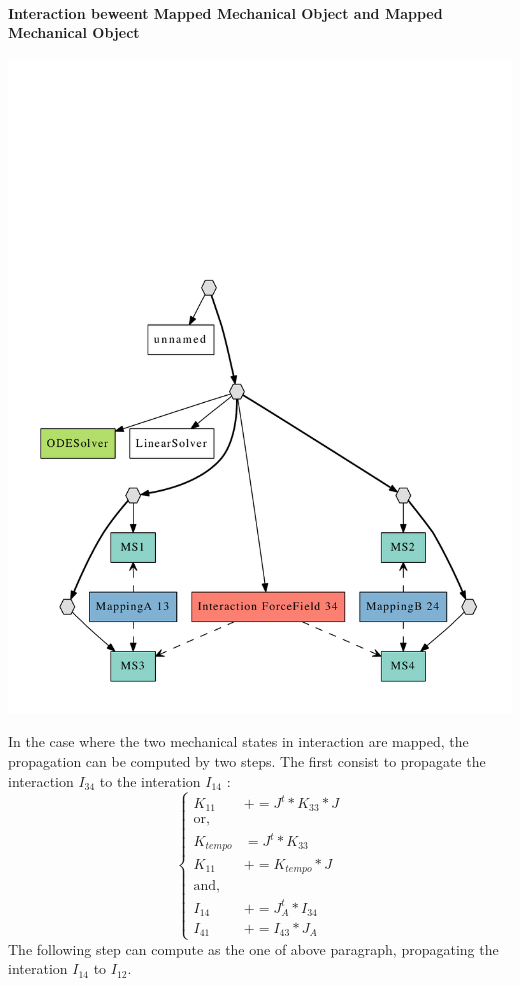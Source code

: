 \paragraph{Interaction beweent Mapped Mechanical Object and Mapped Mechanical Object}
\begin{center}
  \includegraphics[scale=0.3]{interaction_Mapped_Mapped}
\end{center}
In the case where the two mechanical states in interaction are mapped, the propagation can be computed by two steps. The first consist to propagate the interaction $I_{34}$ to the interation $I_{14}$ :
\[
\left\{ 
\begin{array}{ll}
K_{11}       & += J^t * K_{33} * J               \\
\text{or,}   &                                   \\
K_{tempo}    & =  J^t * K_{33}                   \\
K_{11}       & += K_{tempo} * J                  \\ 
\text{and,}&                 \\      
I_{14}       & += J^t_A * I_{34}                  \\ 
I_{41}       & += I_{43} * J_A                        
\end{array}
\right.
\]
The following step can compute as the one of above paragraph, propagating the interation $I_{14}$ to $I_{12}$.


